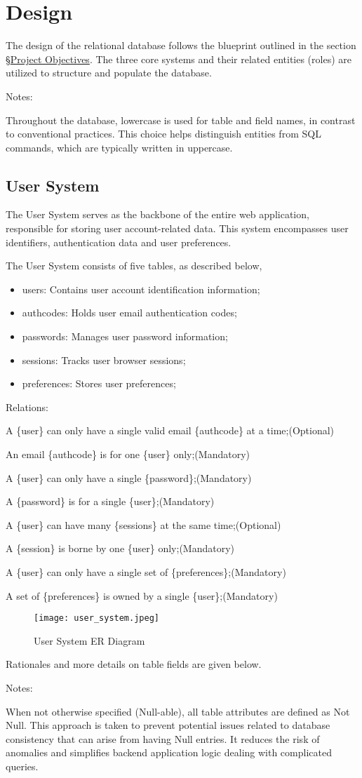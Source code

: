\documentclass[12pt]{report}
\newcommand{\n}{\par}
\newcommand{\br}{\n\vspace{1 em}\n}
\begin{document}
\section{Design} \label{data-layer.design}
The design of the relational database follows the blueprint outlined in the section \S \hyperref[overview.project-objectives]{Project Objectives}.
The three core systems and their related entities (roles) are utilized to structure and populate the database.
\br
Notes:\n
Throughout the database, lowercase is used for table and field names, in contrast to conventional practices.
This choice helps distinguish entities from SQL commands, which are typically written in uppercase.


\subsection{User System} \label{data-layer.design.user-system}
The User System serves as the backbone of the entire web application, responsible for storing user account-related data.
This system encompasses user identifiers, authentication data and user preferences.
\br
The User System consists of five tables, as described below,
\begin{itemize}
	\item users: Contains user account identification information;
	\item authcodes: Holds user email authentication codes;
	\item passwords: Manages user password information;
	\item sessions: Tracks user browser sessions;
	\item preferences: Stores user preferences;
\end{itemize}
Relations:\n
A \{user\} can only have a single valid email \{authcode\} at a time;\null\hfill (Optional)\n
An email \{authcode\} is for one \{user\} only;\null\hfill (Mandatory)
\br
A \{user\} can only have a single \{password\};\null\hfill (Mandatory)\n
A \{password\} is for a single \{user\};\null\hfill (Mandatory)
\br
A \{user\} can have many \{sessions\} at the same time;\null\hfill (Optional)\n
A \{session\} is borne by one \{user\} only;\null\hfill (Mandatory)
\br
A \{user\} can only have a single set of \{preferences\};\null\hfill (Mandatory)\n
A set of \{preferences\} is owned by a single \{user\};\null\hfill (Mandatory)
\br
\begin{figure}[h]
	\centering
	\texttt{[image: user\_system.jpeg]}
	\caption{User System ER Diagram}
	\label{fig:user-system-er}
\end{figure}
\br
Rationales and more details on table fields are given below.\n
Notes:\n
When not otherwise specified (Null-able), all table attributes are defined as Not Null.
This approach is taken to prevent potential issues related to database consistency that can arise from having Null entries.
It reduces the risk of anomalies and simplifies backend application logic dealing with complicated queries.
\end{document}
